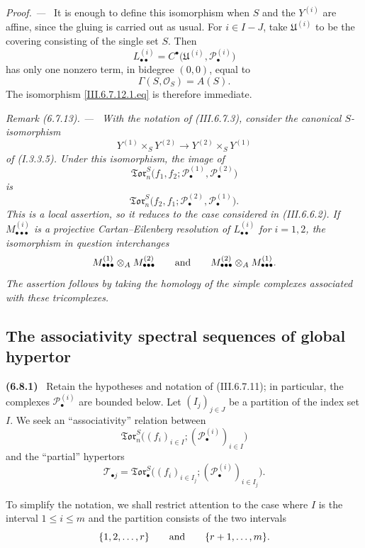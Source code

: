 \documentclass[10pt,oneside]{book}
\newcommand{\sh}[1]{\mathscr{#1}}
\newcommand{\sref}[2][]{(#2)}
\newcommand{\oldpage}[2][]{\setcounter{footnote}{0}\marginpar{\scriptsize\textbf{#1}~|~#2}\ignorespaces}
\newenvironment{env}[1][]{\par\medskip\noindent\textbf{(#1)}\ }{\par}
\newenvironment{remark}[1][]{\par\medskip\noindent\itshape Remark (#1). ---\ }{\par}
\newenvironment{proof}{\par\medskip\noindent\textit{Proof. ---\ }}{\par}
\begin{document}
\begin{proof}
It is enough to define this isomorphism when $S$ and the
$Y^{(i)}$ are affine, since the gluing is carried out as usual.
For $i\in I-J$, take $\mathfrak U^{(i)}$ to be the covering
consisting of the single set $S$.  Then
\[
  L_{\bullet\bullet}^{(i)}
  =
  C^\bullet
  \bigl(
    \mathfrak U^{(i)},\sh P_\bullet^{(i)}
  \bigr)
\]
has only one nonzero term, in bidegree $(0,0)$, equal to
\[
  \Gamma(S,\sh O_S)=A(S).
\]
The isomorphism \eqref{III.6.7.12.1.eq} is therefore immediate.
\end{proof}

\begin{remark}[6.7.13]
\label{III.6.7.13}
With the notation of \sref{III.6.7.3}, consider the canonical
$S$-isomorphism
\[
  Y^{(1)}\times_SY^{(2)}
  \longrightarrow
  Y^{(2)}\times_SY^{(1)}
\]
of \sref[I]{I.3.3.5}.  Under this isomorphism, the image of
\[
  \mathfrak{Tor}_n^S
  \bigl(
    f_1,f_2;
    \sh P_\bullet^{(1)},\sh P_\bullet^{(2)}
  \bigr)
\]
is
\[
  \mathfrak{Tor}_n^S
  \bigl(
    f_2,f_1;
    \sh P_\bullet^{(2)},\sh P_\bullet^{(1)}
  \bigr).
\]
This is a local assertion, so it reduces to the case considered in
\sref{III.6.6.2}.  If
$M_{\bullet\bullet\bullet}^{(i)}$ is a projective
Cartan--Eilenberg resolution of $L_{\bullet\bullet}^{(i)}$ for
$i=1,2$, the isomorphism in question interchanges
\[
  M_{\bullet\bullet\bullet}^{(1)}
  \otimes_A
  M_{\bullet\bullet\bullet}^{(2)}
  \qquad\hbox{and}\qquad
  M_{\bullet\bullet\bullet}^{(2)}
  \otimes_A
  M_{\bullet\bullet\bullet}^{(1)}.
\]
The assertion follows by taking the homology of the simple
complexes associated with these tricomplexes.
\end{remark}

\subsection{The associativity spectral sequences of global hypertor}
\label{subsection:III.6.8}
\label{III.6.8}

\begin{env}[6.8.1]
\label{III.6.8.1}
Retain the hypotheses and notation of \sref{III.6.7.11}; in
particular, the complexes $\sh P_\bullet^{(i)}$ are bounded
below.  Let $(I_j)_{j\in J}$ be a partition of the index set $I$.
We seek an ``associativity'' relation between
\[
  \mathfrak{Tor}_n^S
  \bigl(
    (f_i)_{i\in I};
    (\sh P_\bullet^{(i)})_{i\in I}
  \bigr)
\]
and the ``partial'' hypertors
\[
  \mathcal T_{\bullet j}
  =
  \mathfrak{Tor}_\bullet^S
  \bigl(
    (f_i)_{i\in I_j};
    (\sh P_\bullet^{(i)})_{i\in I_j}
  \bigr).
\]
\oldpage[III]{165}

To simplify the notation, we shall restrict attention to the case
where $I$ is the interval $1\leq i\leq m$ and the partition
consists of the two intervals
\[
  \{1,2,\ldots,r\}
  \qquad\hbox{and}\qquad
  \{r+1,\ldots,m\}.
\]
\end{env}
\end{document}
